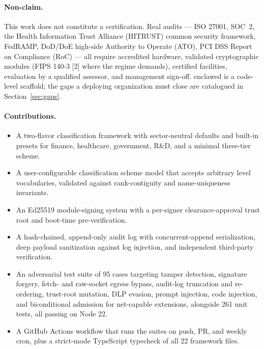 \documentclass[11pt]{article}
\begin{document}
\paragraph{Non-claim.} This work does not constitute a certification.
Real audits --- ISO 27001, SOC~2, the Health Information Trust Alliance
(HITRUST) common security framework, FedRAMP, DoD/DoE high-side
Authority to Operate (ATO), PCI DSS Report on Compliance (RoC) --- all
require accredited hardware, validated cryptographic modules (FIPS
140-3 [2] where the regime demands), certified facilities, evaluation
by a qualified assessor, and management sign-off. enclawed is a
code-level scaffold; the gaps a deploying organization must close are
catalogued in Section~\ref{sec:gaps}.

\paragraph{Contributions.}
\begin{itemize}
  \item A two-flavor classification framework with sector-neutral
    defaults and built-in presets for finance, healthcare, government,
    R\&D, and a minimal three-tier scheme.
  \item A user-configurable classification scheme model that accepts
    arbitrary level vocabularies, validated against rank-contiguity and
    name-uniqueness invariants.
  \item An Ed25519 module-signing system with a per-signer
    clearance-approval trust root and boot-time pre-verification.
  \item A hash-chained, append-only audit log with concurrent-append
    serialization, deep payload sanitization against log injection, and
    independent third-party verification.
  \item An adversarial test suite of 95 cases targeting tamper
    detection, signature forgery, fetch- and raw-socket egress bypass,
    audit-log truncation and re-ordering, trust-root mutation, DLP
    evasion, prompt injection, code injection, and biconditional
    admission for net-capable extensions, alongside 261 unit tests, all
    passing on Node 22.
  \item A GitHub Actions workflow that runs the suites on push, PR, and
    weekly cron, plus a strict-mode TypeScript typecheck of all 22
    framework files.
\end{itemize}

\end{document}
